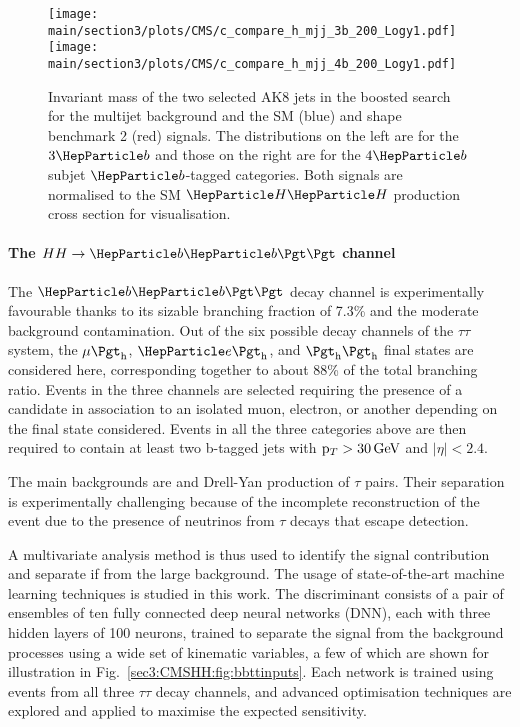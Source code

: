 \begin{figure}[!htb]
\centering 
    \texttt{[image: \\main/section3/plots/CMS/c\_compare\_h\_mjj\_3b\_200\_Logy1.pdf]}
    \texttt{[image: \\main/section3/plots/CMS/c\_compare\_h\_mjj\_4b\_200\_Logy1.pdf]}
\caption{Invariant mass of the two selected AK8 jets in the boosted \bbbb \HH search for the multijet background and the SM (blue) and shape benchmark 2 (red) signals.
    The distributions on the left are for the $3\PQb$ and those on the right are for the $4\PQb$ subjet $\PQb$-tagged categories.
    Both signals are normalised to the SM $\PH\PH$ production cross section for visualisation.} 
\label{sec3:CMSHH:fig:bbbb_boosted} 
\end{figure}



\paragraph{The $HH \rightarrow \bbtt$ channel}

The $\bbtt$ decay channel is experimentally favourable thanks to its sizable branching fraction of 7.3\% and the moderate background contamination.
Out of the six possible decay channels of the $\tau\tau$ system, the $\mu\tauh$, $\Pe\tauh$, and $\tauh\tauh$ final states are considered here, corresponding together to about 88\% of the total branching ratio.
Events in the three channels are selected requiring the presence of a \tauh candidate in association to an isolated muon, electron, or another \tauh depending on the final state considered.
Events in all the three categories above are then required to contain at least two b-tagged jets with $\mathrm{p}_{T} > 30\,\text{Ge\hspace{-.08em}V}$ and $|\eta| < 2.4$. 

The main backgrounds are \ttbar and Drell-Yan production of $\tau$ pairs.
Their separation is experimentally challenging because of the incomplete reconstruction of the event due to the presence of neutrinos from $\tau$ decays that escape detection.

A multivariate analysis method is thus used to identify the signal contribution and separate if from the large background.
The usage of state-of-the-art machine learning techniques is studied in this work.
The discriminant consists of a pair of ensembles of ten fully connected deep neural networks (DNN), each with three hidden layers of 100 neurons, trained to separate the \HH signal from the background processes using a wide set of kinematic variables, a few of which are shown for illustration in Fig.~\ref{sec3:CMSHH:fig:bbttinputs}.
Each network is trained using events from all three $\tau\tau$ decay channels, and advanced optimisation techniques are explored and applied to maximise the expected sensitivity.

